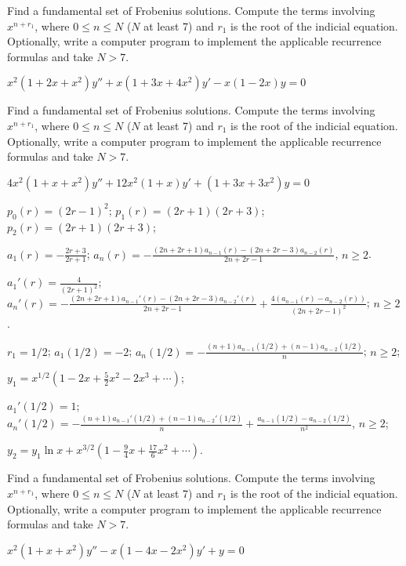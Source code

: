\documentclass{ximera}
\begin{document}
\begin{problem}\label{exer:7.6.3}
Find a fundamental set of Frobenius solutions. Compute the terms involving $x^{n+r_1}$, where $0\leq n \leq N$ ($N$ at least 7) and $r_1$ is the root of the indicial equation. Optionally, write a computer
program to implement the applicable recurrence formulas and take $N > 7$.

$x^2(1+2x+x^2)y''+x(1+3x+4x^2)y'-x(1-2x)y=0$
\end{problem}

\begin{problem}\label{exer:7.6.4}
Find a fundamental set of Frobenius solutions. Compute the terms involving $x^{n+r_1}$, where $0\leq n \leq N$ ($N$ at least 7) and $r_1$ is the root of the indicial equation. Optionally, write a computer
program to implement the applicable recurrence formulas and take $N > 7$.

$4x^2(1+x+x^2)y''+12x^2(1+x)y'+(1+3x+3x^2)y=0$

\begin{solution}
    $p_0(r)=(2r-1)^2$;
$p_1(r)=(2r+1)(2r+3)$;
$p_2(r)=(2r+1)(2r+3)$;

$a_1(r)=-\frac{2r+3}{2r+1}$;
$a_n(r)=
-\frac{(2n+2r+1)a_{n-1}(r)-(2n+2r-3)a_{n-2}(r)}{2n+2r-1}$,
$n\geq 2$.

$a_1'(r)=\frac{4}{(2r+1)^2}$;
$a_n'(r)=
-\frac{(2n+2r+1)a_{n-1}'(r)-(2n+2r-3)a_{n-2}'(r)}{2n+2r-1}
+\frac{4(a_{n-1}(r)-a_{n-2}(r))}{(2n+2r-1)^2}$;
$n\geq 2$.

$r_1=1/2$;
$a_1(1/2)=-2$;
$a_n(1/2)=
-\frac{(n+1)a_{n-1}(1/2)+(n-1)a_{n-2}(1/2)}{ n}$;
$n\geq 2$;

$y_1=x^{1/2}\left(1-2x+\frac{5}{2}x^2-2x^3+\cdots\right)$;

$a_1'(1/2)=1$;
$a_n'(1/2)=
-\frac{(n+1)a_{n-1}'(1/2)+(n-1)a_{n-2}'(1/2)}{ n}
+\frac{a_{n-1}(1/2)-a_{n-2}(1/2)}{ n^2}$,
$n\geq 2$;

$y_2=
y_1\ln x+x^{3/2}\left(1-\frac{9}{4}x+\frac{17}{6}x^2+
\cdots\right)$.
\end{solution}
\end{problem}

\begin{problem}\label{exer:7.6.5}
Find a fundamental set of Frobenius solutions. Compute the terms involving $x^{n+r_1}$, where $0\leq n \leq N$ ($N$ at least 7) and $r_1$ is the root of the indicial equation. Optionally, write a computer
program to implement the applicable recurrence formulas and take $N > 7$.

$x^2(1+x+x^2)y''-x(1-4x-2x^2)y'+y=0$
\end{problem}
\end{document}
